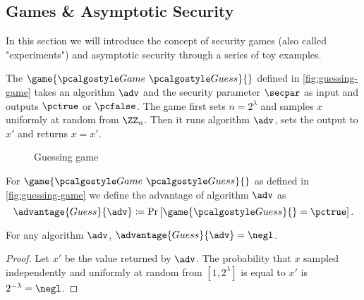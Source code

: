 \subsection{Games \& Asymptotic Security}

In this section we will introduce the concept of security games (also called "experiments") and asymptotic security through a series of toy examples.

The $\game{\Game~\algo{Guess}}{}$ defined in \autoref{fig:guessing-game} takes an algorithm $\adv$ and the security parameter $\secpar$ as input and outputs $\pctrue$ or $\pcfalse$.
The game first sets $n = 2^\lambda$ and samples $x$ uniformly at random from $\ZZ_n$.
Then it runs algorithm $\adv$, sets the output to $x'$ and returns $x = x'$.

\begin{figure}[tbhp]
  \begin{center}
    \begin{tcolorbox}[width=3cm]
      \begin{pchstack}[center]
      \end{pchstack}
    \end{tcolorbox}
  \end{center}
  \caption{Guessing game\label{fig:guessing-game}}
\end{figure}

\begin{definition}
  For $\game{\Game~\algo{Guess}}{}$ as defined in \autoref{fig:guessing-game} we define the advantage of algorithm $\adv$ as
 \[
  \advantage{Guess}{\adv} \defeq \pr{\game{\algo{Guess}}{} = \pctrue}.
 \]
\end{definition}

\begin{proposition}
  For any algorithm $\adv$, $\advantage{Guess}{\adv} = \negl$.
\end{proposition}

\begin{proof}
Let $x'$ be the value returned by $\adv$.
The probability that $x$ sampled independently and uniformly at random from $[1, 2^\lambda]$ is equal to $x'$ is $2^{-\lambda} = \negl$.
\end{proof}

